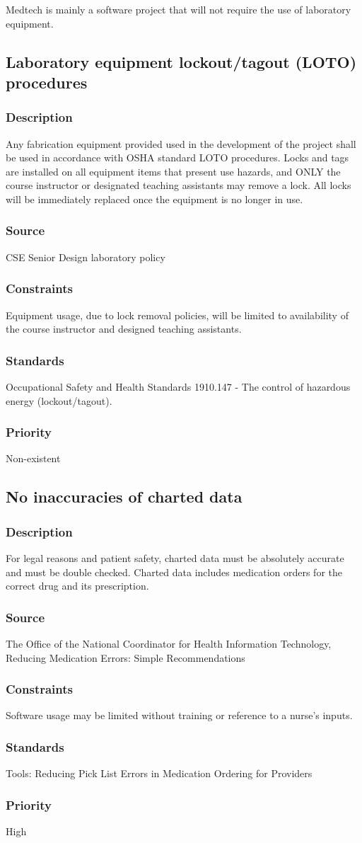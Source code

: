 Medtech is mainly a software project that will not require the use of laboratory equipment.

\subsection{Laboratory equipment lockout/tagout (LOTO) procedures}
\subsubsection{Description}
Any fabrication equipment provided used in the development of the project shall be used in accordance with OSHA standard LOTO procedures. Locks and tags are installed on all equipment items that present use hazards, and ONLY the course instructor or designated teaching assistants may remove a lock. All locks will be immediately replaced once the equipment is no longer in use.
\subsubsection{Source}
CSE Senior Design laboratory policy
\subsubsection{Constraints}
Equipment usage, due to lock removal policies, will be limited to availability of the course instructor and designed teaching assistants.
\subsubsection{Standards}
Occupational Safety and Health Standards 1910.147 - The control of hazardous energy (lockout/tagout).
\subsubsection{Priority}
Non-existent

\subsection{No inaccuracies of charted data}
\subsubsection{Description}
For legal reasons and patient safety, charted data must be absolutely accurate and must be double checked. Charted data includes medication orders for the correct drug and its prescription.
\subsubsection{Source}
The Office of the National Coordinator for Health Information Technology, Reducing Medication Errors: Simple Recommendations
\subsubsection{Constraints}
Software usage may be limited without training or reference to a nurse's inputs.
\subsubsection{Standards}
Tools: Reducing Pick List Errors in Medication Ordering for Providers \cite{AndrewGettinger2016}
\subsubsection{Priority}
High

